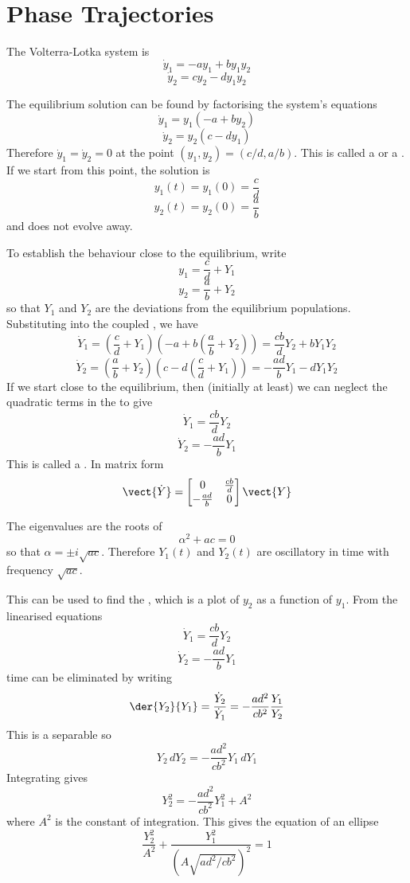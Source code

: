 %
%
%
%


\section{Phase Trajectories}

The Volterra-Lotka system is
$$\dot{y}_1=-ay_1+by_1y_2$$
$$\dot{y}_2=cy_2-dy_1y_2$$

The equilibrium solution  can be found by factorising the system's equations
$$\dot{y}_1=y_1(-a+by_2)$$
$$\dot{y}_2=y_2(c-dy_1)$$
Therefore $\dot{y}_1=\dot{y}_2=0$ at the point $(y_1,y_2)=\left(c/d,
a/b\right)$.  This is called a  or a
.  If we start from this point, the solution is
$$y_1(t)=y_1(0)=\frac{c}{d}$$
$$y_2(t)=y_2(0)=\frac{a}{b}$$
and does not evolve away.

To establish the behaviour close to the equilibrium, write
$$y_1=\frac{c}{d}+Y_1$$
$$y_2=\frac{a}{b}+Y_2$$
so that $Y_1$ and $Y_2$ are the deviations from the equilibrium populations.
Substituting into the coupled \ODEs, we have
$$\dot{Y}_1=\left(\frac{c}{d}+Y_1\right)\left(-a+b\left(\frac{a}{b}+Y_2
\right)\right)=\frac{cb}{d}Y_2+bY_1Y_2$$
$$\dot{Y}_2=\left(\frac{a}{b}+Y_2\right)\left(c-d\left(\frac{c}{d}+Y_1
\right)\right)=-\frac{ad}{b}Y_1-dY_1Y_2$$
If we start close to the equilibrium, then (initially at least) we can
neglect the quadratic terms in the \ODE to give
$$\dot{Y}_1=\frac{cb}{d}Y_2$$
$$\dot{Y}_2=-\frac{ad}{b}Y_1$$
This is called a .  In matrix form
$$\vect{\dot{Y}}=\begin{bmatrix}0&\frac{cb}{d}\\-\frac{ad}{b}&0
\end{bmatrix}\vect{Y}$$

The eigenvalues are the roots of
$$\alpha^2+ac=0$$
so that $\alpha=\pm i\sqrt{ac}$.  Therefore $Y_1(t)$ and $Y_2(t)$ are
oscillatory in time with frequency $\sqrt{ac}$.

This can be used to find the , which is a plot of
$y_2$ as a function of $y_1$.  From the linearised equations
$$\dot{Y}_1=\frac{cb}{d}Y_2$$
$$\dot{Y}_2=-\frac{ad}{b}Y_1$$
time can be eliminated by writing
$$\der{Y_2}{Y_1}=\frac{\dot{Y}_2}{\dot{Y}_1}
=-\frac{ad^2}{cb^2}\frac{Y_1}{Y_2}$$
This is a separable \ODE so
$$Y_2\,dY_2=-\frac{ad^2}{cb^2}Y_1\,dY_1$$
Integrating gives
$$Y_2^2=-\frac{ad^2}{cb^2}Y_1^2+A^2$$
where $A^2$ is the constant of integration.  This gives the equation of an
ellipse
$$\frac{Y_2^2}{A^2}+\frac{Y_1^2}{\left(A\sqrt{ad^2/cb^2}\right)^2}
=1$$

